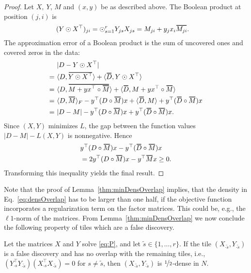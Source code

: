 \begin{proof}
Let $X,\ Y$, $M$ and $(x,y)$ be as described above. The Boolean product  at position $(j,i)$ is
\begin{align*}
(Y\odot X^\top )_{ji}&= \odot_{s=1}^rY_{js}X_{js}= M_{ji} + y_jx_i\thickbar{M_{ji}}.
\end{align*}
The approximation error of a Boolean product is the sum of uncovered ones and covered zeros in the data: 
\begin{align*}
&|D-Y\odot X^\top | \\
=\ &\langle D,\thickbar{Y\odot X^\top }\rangle +\langle\thickbar{D},Y\odot X^\top \rangle\\
=\ &\langle D,\thickbar{M+ yx^\top \circ \thickbar{M}}\rangle +\langle\thickbar{D},M+ yx^\top \circ \thickbar{M}\rangle\\
=\ &\langle D,\thickbar{M}\rangle_F - y^\top (D\circ \thickbar{M})x +\langle\thickbar{D},M\rangle + y^\top (\thickbar{D}\circ \thickbar{M})x\\
=\ &|D-M| - y^\top (D\circ \thickbar{M})x + y^\top (\thickbar{D}\circ \thickbar{M})x.
\end{align*}
Since $(X,Y)$ minimizes $L$, the gap between the function values $|D-M|-L(X,Y)$ is nonnegative. Hence
\begin{align*}
& y^\top (D\circ \thickbar{M})x - y^\top (\thickbar{D}\circ\thickbar{M})x\\
&= 2y^\top (D\circ \thickbar{M})x - y^\top \thickbar{M}x \geq 0.
\end{align*}
Transforming this inequality yields the final result.
\end{proof}
%
Note that the proof of Lemma~\ref{thm:minDensOverlap} implies, that the density in Eq.~\eqref{eq:densOverlap} has to be larger than one half, if the objective function incorporates a regularization term on the factor matrices. This could be, e.g., the $\ell1$-norm of the matrices. From Lemma~\ref{thm:minDensOverlap} we now conclude the following property of tiles which are a false discovery.  
\begin{corollary}
Let the matrices $X$ and $Y$ solve \eqref{eq:P}, and let $\tilde{s}\in\{1,\ldots,r\}$. If the tile $(X_{\cdot \tilde{s}},Y_{\cdot \tilde{s}})$ is a false discovery and has no overlap with the remaining tiles, i.e., $(Y_{\cdot s}^\top Y_{\cdot \tilde{s}})(X_{\cdot s}^\top X_{\cdot \tilde{s}})=0$ for $s\neq \tilde{s}$, then $(X_{\cdot \tilde{s}},Y_{\cdot \tilde{s}})$ is $\nicefrac{1}{2}$-dense in $N$.
\end{corollary}

